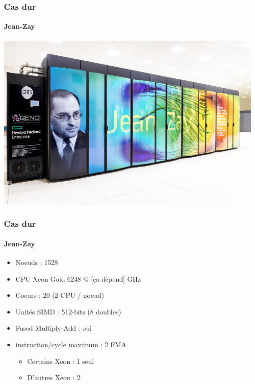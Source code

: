 \documentclass[xcolor={x11names,svgnames}]{beamer}
\begin{document}

\begin{frame}
  \frametitle{Cas dur}
  \framesubtitle{Jean-Zay}

  \includegraphics[width=\textwidth]{jean-zay-bis}
\end{frame}

\begin{frame}
  \frametitle{Cas dur}
  \framesubtitle{Jean-Zay}

  \begin{itemize}
  \item Noeuds : 1528
  \item CPU Xeon Gold 6248 @ \alert{[ça dépend]} GHz
  \item Coeurs : 20 (2 CPU / noeud)
  \item Unités SIMD : 512-bits (8 doubles)
  \item Fused Multiply-Add : oui
  \item instruction/cycle maximum : \alert{2 FMA}
    \begin{itemize}
    \item Certains Xeon : 1 seul
    \item D'autres Xeon : 2
    \end{itemize}
  \end{itemize}
\end{frame}

\end{document}
